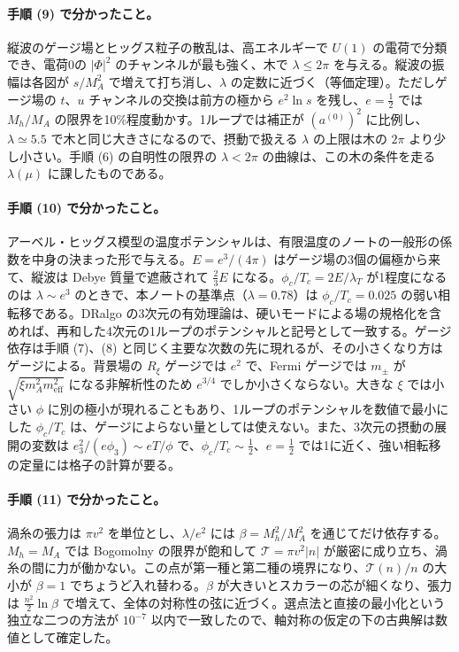 \documentclass[a4paper,10pt]{ltjsarticle}
\begin{document}
\paragraph{手順 (9) で分かったこと。}縦波のゲージ場とヒッグス粒子の散乱は、高エネルギーで $U(1)$ の電荷で分類でき、電荷0の $|\Phi|^2$ のチャンネルが最も強く、木で $\lambda\le2\pi$ を与える。縦波の振幅は各図が $s/M_A^2$ で増えて打ち消し、$\lambda$ の定数に近づく（等価定理）。ただしゲージ場の $t$、$u$ チャンネルの交換は前方の極から $e^2\ln s$ を残し、$e=\frac12$ では $M_h/M_A$ の限界を10\%程度動かす。1ループでは補正が $(a^{(0)})^2$ に比例し、$\lambda\simeq5.5$ で木と同じ大きさになるので、摂動で扱える $\lambda$ の上限は木の $2\pi$ より少し小さい。手順 (6) の自明性の限界の $\lambda<2\pi$ の曲線は、この木の条件を走る $\lambda(\mu)$ に課したものである。

\paragraph{手順 (10) で分かったこと。}アーベル・ヒッグス模型の温度ポテンシャルは、有限温度のノートの一般形の係数を中身の決まった形で与える。$E=e^3/(4\pi)$ はゲージ場の3個の偏極から来て、縦波は Debye 質量で遮蔽されて $\frac23E$ になる。$\phi_c/T_c=2E/\lambda_T$ が1程度になるのは $\lambda\sim e^3$ のときで、本ノートの基準点（$\lambda=0.78$）は $\phi_c/T_c=0.025$ の弱い相転移である。DRalgo の3次元の有効理論は、硬いモードによる場の規格化を含めれば、再和した4次元の1ループのポテンシャルと記号として一致する。ゲージ依存は手順 (7)、(8) と同じく主要な次数の先に現れるが、その小さくなり方はゲージによる。背景場の $R_\xi$ ゲージでは $e^2$ で、Fermi ゲージでは $m_\pm$ が $\sqrt{\xi m_A^2m_{\mathrm{eff}}^2}$ になる非解析性のため $e^{3/4}$ でしか小さくならない。大きな $\xi$ では小さい $\phi$ に別の極小が現れることもあり、1ループのポテンシャルを数値で最小にした $\phi_c/T_c$ は、ゲージによらない量としては使えない。また、3次元の摂動の展開の変数は $e_3^2/(e\phi_3)\sim eT/\phi$ で、$\phi_c/T_c\sim\frac12$、$e=\frac12$ では1に近く、強い相転移の定量には格子の計算が要る。

\paragraph{手順 (11) で分かったこと。}渦糸の張力は $\pi v^2$ を単位とし、$\lambda/e^2$ には $\beta=M_h^2/M_A^2$ を通じてだけ依存する。$M_h=M_A$ では Bogomolny の限界が飽和して $\mathcal T=\pi v^2|n|$ が厳密に成り立ち、渦糸の間に力が働かない。この点が第一種と第二種の境界になり、$\mathcal T(n)/n$ の大小が $\beta=1$ でちょうど入れ替わる。$\beta$ が大きいとスカラーの芯が細くなり、張力は $\frac{n^2}2\ln\beta$ で増えて、全体の対称性の弦に近づく。選点法と直接の最小化という独立な二つの方法が $10^{-7}$ 以内で一致したので、軸対称の仮定の下の古典解は数値として確定した。
\end{document}
